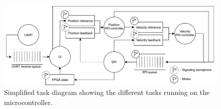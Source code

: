 \documentclass[../../main.tex]{subfiles}
\begin{document}
\begin{figure}[H]
    \centering
    \includegraphics[width=\textwidth]{Sections/System_Implementation/Images/OverviewTaskDiagramSimple.pdf}
    \caption{Simplified task diagram showing the different tasks running on the microcontroller.}
    \label{fig:OverviewTaskDiagramSimple}
\end{figure}






\end{document}
